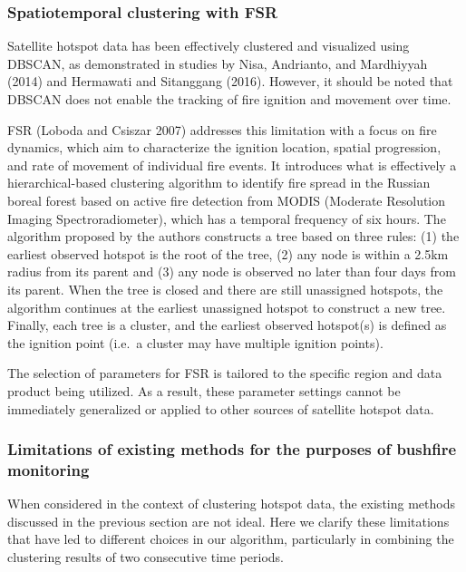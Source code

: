 \hypertarget{spatiotemporal-clustering-with-fsr}{%
\subsubsection{Spatiotemporal clustering with FSR}\label{spatiotemporal-clustering-with-fsr}}

Satellite hotspot data has been effectively clustered and visualized using DBSCAN, as demonstrated in studies by Nisa, Andrianto, and Mardhiyyah (2014) and Hermawati and Sitanggang (2016). However, it should be noted that DBSCAN does not enable the tracking of fire ignition and movement over time.

FSR (Loboda and Csiszar 2007) addresses this limitation with a focus on fire dynamics, which aim to characterize the ignition location, spatial progression, and rate of movement of individual fire events. It introduces what is effectively a hierarchical-based clustering algorithm to identify fire spread in the Russian boreal forest based on active fire detection from MODIS (Moderate Resolution Imaging Spectroradiometer), which has a temporal frequency of six hours. The algorithm proposed by the authors constructs a tree based on three rules: (1) the earliest observed hotspot is the root of the tree, (2) any node is within a 2.5km radius from its parent and (3) any node is observed no later than four days from its parent. When the tree is closed and there are still unassigned hotspots, the algorithm continues at the earliest unassigned hotspot to construct a new tree. Finally, each tree is a cluster, and the earliest observed hotspot(s) is defined as the ignition point (i.e.~a cluster may have multiple ignition points).

The selection of parameters for FSR is tailored to the specific region and data product being utilized. As a result, these parameter settings cannot be immediately generalized or applied to other sources of satellite hotspot data.

\hypertarget{limitations-of-existing-methods-for-the-purposes-of-bushfire-monitoring}{%
\subsubsection{Limitations of existing methods for the purposes of bushfire monitoring}\label{limitations-of-existing-methods-for-the-purposes-of-bushfire-monitoring}}

When considered in the context of clustering hotspot data, the existing methods discussed in the previous section are not ideal. Here we clarify these limitations that have led to different choices in our algorithm, particularly in combining the clustering results of two consecutive time periods.

